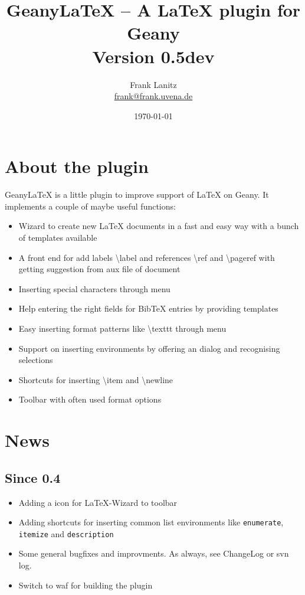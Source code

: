 \documentclass[%
a4paper,%
10pt,%
oneside,%
DIV18,
headsepline,
plainheadsepline,
footsepline,
plainfootsepline,
bibtotoc,%
liststotoc,%
BCOR12mm,%
halfparskip,%
openany,%
]{scrartcl}
\title{Geany\LaTeX{} -- A \LaTeX{} plugin for Geany \\[1.5ex]
	   \normalsize Version 0.5dev}
\author{Frank Lanitz \\ \small{\href{mailto:frank@frank.uvena.de}{frank@frank.uvena.de}}}
\date{\today}
\begin{document}
\newpage
\dedication{\normalsize \textbf{Note:} Please note the document has been created on
\today. If you are using devel version from SVN, please compile and check
\texttt{doc/geanylatex.tex} from sources. Please check page \pageref
{sec:compiling_of_documentation}, section \ref{sec:compiling_of_documentation} how to do so. }

\maketitle
\tableofcontents
\listoftables
\newpage
{}
\section{About the plugin}

Geany\LaTeX{} is a little plugin to improve support of \LaTeX{} on Geany.
It implements a couple of maybe useful functions:

\begin{itemize}
	\item Wizard to create new \LaTeX{} documents in a fast and easy way
	 	  with a bunch of templates available
	\item A front end for add labels \textbackslash label{} and
		  references \textbackslash ref{} and \textbackslash pageref{}
   		  with getting suggestion from aux file of document
	\item Inserting special characters through menu
	\item Help entering the right fields for BibTeX entries by
		  providing templates
	\item Easy inserting format patterns like \textbackslash texttt{}
		  through menu
	\item Support on inserting environments by offering an dialog and
		  recognising selections
	\item Shortcuts for inserting \textbackslash item and
		  \textbackslash newline
	\item Toolbar with often used format options
\end{itemize}

\section{News}
\subsection*{Since 0.4}
\begin{itemize}
	\item Adding a icon for \LaTeX-Wizard to toolbar
	\item Adding shortcuts for inserting common list environments
		  like \texttt{enumerate}, \texttt{itemize} and
		  \texttt{description}
	\item Some general bugfixes and improvments. As always, see
		  ChangeLog or svn log.
	\item Switch to waf for building the plugin
\end{itemize}
\end{document}

